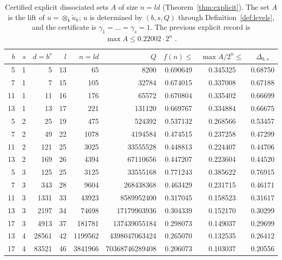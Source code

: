 \documentclass[12pt]{article}
\begin{document}
\begin{table}[ht]
\centering\small
\begin{tabular}{rrrrrrccc}
\toprule
$b$ & $s$ & $d=b^s$ & $l$ & $n=ld$ & $Q$ & $f(n)\le$ & $\max A/2^n\le$ & $\Delta_{b,s}$\\
\midrule
5 & 1 & 5 & 13 & 65 & 8200 & 0.690649 & 0.345325 & 0.68750\\
7 & 1 & 7 & 15 & 105 & 32784 & 0.674015 & 0.337008 & 0.67188\\
11 & 1 & 11 & 16 & 176 & 65572 & 0.670804 & 0.335402 & 0.66699\\
13 & 1 & 13 & 17 & 221 & 131120 & 0.669767 & 0.334884 & 0.66675\\
5 & 2 & 25 & 19 & 475 & 524392 & 0.537132 & 0.268566 & 0.53457\\
7 & 2 & 49 & 22 & 1078 & 4194584 & 0.474515 & 0.237258 & 0.47299\\
11 & 2 & 121 & 25 & 3025 & 33555528 & 0.448813 & 0.224407 & 0.44706\\
13 & 2 & 169 & 26 & 4394 & 67110656 & 0.447207 & 0.223604 & 0.44520\\
5 & 3 & 125 & 25 & 3125 & 33555168 & 0.771243 & 0.385622 & 0.76915\\
7 & 3 & 343 & 28 & 9604 & 268438368 & 0.463429 & 0.231715 & 0.46171\\
11 & 3 & 1331 & 33 & 43923 & 8589952400 & 0.317045 & 0.158523 & 0.31617\\
13 & 3 & 2197 & 34 & 74698 & 17179903936 & 0.304339 & 0.152170 & 0.30299\\
17 & 3 & 4913 & 37 & 181781 & 137439055184 & 0.298073 & 0.149037 & 0.29699\\
13 & 4 & 28561 & 42 & 1199562 & 4398047063424 & 0.265070 & 0.132535 & 0.26412\\
17 & 4 & 83521 & 46 & 3841966 & 70368746289408 & 0.206073 & 0.103037 & 0.20556\\
\bottomrule
\end{tabular}
\caption{Certified explicit dissociated sets $A$ of size $n=ld$ (Theorem~\ref{thm:explicit}). The set $A$ is the lift of
$u=\otimes_k\tilde u_k$; $u$ is determined by $(b,s,Q)$ through Definition~\ref{def:levels}, and the certificate is
$\gamma_1=\dots=\gamma_s=1$. The previous explicit record is $\max A\le0.22002\cdot2^{n}$ \cite{Bo98}.}
\label{tab:main}
\end{table}
\end{document}
